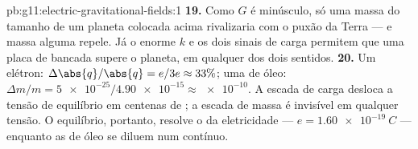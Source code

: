 \begin{solution}{pb:g11:electric-gravitational-fields:1}
\textbf{19.} Como $G$ é minúsculo, só uma massa do tamanho de um planeta
colocada acima rivalizaria com o puxão da Terra --- e massa alguma
repele. Já o enorme $k$ e os dois sinais de carga permitem que uma placa
de bancada supere o planeta, em qualquer dos dois sentidos.
\textbf{20.} Um elétron: $\Delta\abs{q}/\abs{q} = e/3e \approx 33\%$; uma
 de óleo:
$\Delta m/m = \num{5e-25} / \num{4.90e-15} \approx \num{e-10}$. A escada
de carga desloca a tensão de equilíbrio em centenas de ; a escada de
massa é invisível em qualquer tensão. O equilíbrio, portanto, resolve o
 da eletricidade --- $e = \qty{1.60e-19}{C}$ --- enquanto as
 de óleo se diluem num contínuo.
\end{solution}
